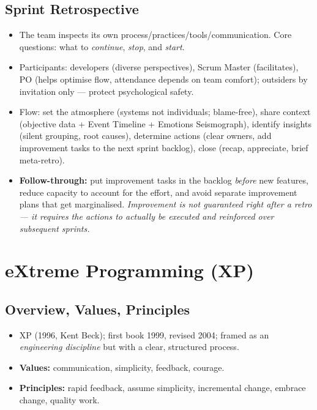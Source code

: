 \documentclass[hidelinks]{article}
\begin{document}
\subsection{Sprint Retrospective}
\begin{itemize}
  \item The team inspects its own process/practices/tools/communication. Core questions:
        what to \emph{continue}, \emph{stop}, and \emph{start}.
  \item Participants: developers (diverse perspectives), Scrum Master (facilitates), PO (helps
        optimise flow, attendance depends on team comfort); outsiders by invitation only --- protect
        psychological safety.
  \item Flow: set the atmosphere (systems not individuals; blame-free), share context (objective
        data + Event Timeline + Emotions Seismograph), identify insights (silent grouping, root
        causes), determine actions (clear owners, add improvement tasks to the next sprint backlog),
        close (recap, appreciate, brief meta-retro).
  \item \textbf{Follow-through:} put improvement tasks in the backlog \emph{before} new features,
        reduce capacity to account for the effort, and avoid separate improvement plans that get
        marginalised. \emph{Improvement is not guaranteed right after a retro --- it requires the
        actions to actually be executed and reinforced over subsequent sprints.}
\end{itemize}

\section{eXtreme Programming (XP)}

\subsection{Overview, Values, Principles}
\begin{itemize}
  \item XP (1996, Kent Beck); first book 1999, revised 2004; framed as an \emph{engineering
        discipline} but with a clear, structured process.
  \item \textbf{Values:} communication, simplicity, feedback, courage.
  \item \textbf{Principles:} rapid feedback, assume simplicity, incremental change, embrace change,
        quality work.
\end{itemize}
\end{document}
